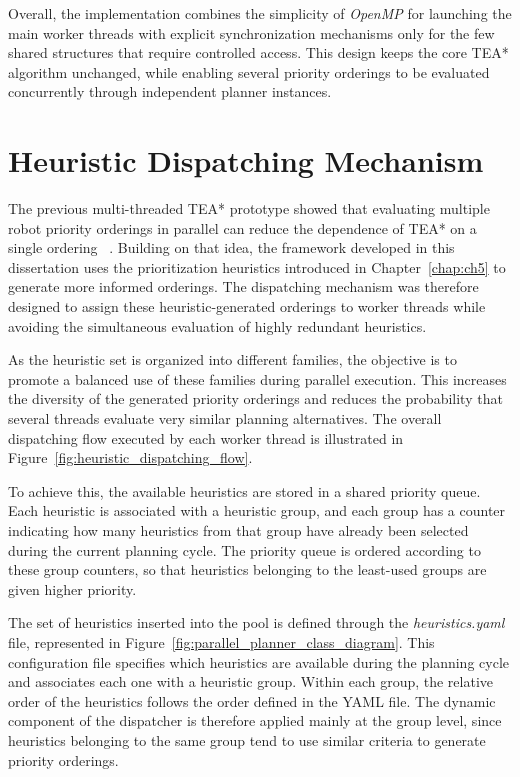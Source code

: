 Overall, the implementation combines the simplicity of \textit{OpenMP} for launching the main worker
threads with explicit synchronization mechanisms only for the few shared structures that require
controlled access. This design keeps the core TEA* algorithm unchanged, while enabling several
priority orderings to be evaluated concurrently through independent planner instances.


\section{Heuristic Dispatching Mechanism}
\label{sec:heuristic_dispatching}
\hspace{\parindent}
The previous multi-threaded TEA* prototype showed that evaluating multiple robot priority
orderings in parallel can reduce the dependence of TEA* on a single ordering
~\cite{ribeiro2025parallel}. Building on that idea, the framework developed in this dissertation uses
the prioritization heuristics introduced in Chapter~\ref{chap:ch5} to generate more informed
orderings. The dispatching mechanism was therefore designed to assign these heuristic-generated
orderings to worker threads while avoiding the simultaneous evaluation of highly redundant
heuristics.

As the heuristic set is organized into different families, the objective is to promote a balanced use
of these families during parallel execution. This increases the diversity of the generated priority
orderings and reduces the probability that several threads evaluate very similar planning
alternatives. The overall dispatching flow executed by each worker thread is illustrated in
Figure~\ref{fig:heuristic_dispatching_flow}.

To achieve this, the available heuristics are stored in a shared priority queue. Each heuristic is
associated with a heuristic group, and each group has a counter indicating how many heuristics from
that group have already been selected during the current planning cycle. The priority queue is
ordered according to these group counters, so that heuristics belonging to the least-used groups are
given higher priority.

The set of heuristics inserted into the pool is defined through the \textit{heuristics.yaml} file,
represented in Figure~\ref{fig:parallel_planner_class_diagram}. This configuration file specifies
which heuristics are available during the planning cycle and associates each one with a heuristic
group. Within each group, the relative order of the heuristics follows the order defined in the YAML
file. The dynamic component of the dispatcher is therefore applied mainly at the group level, since
heuristics belonging to the same group tend to use similar criteria to generate priority orderings.

